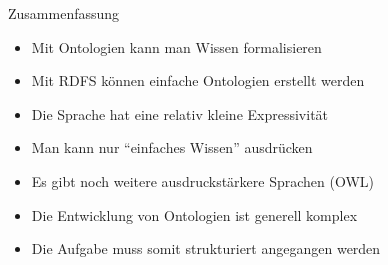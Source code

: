 \documentclass{beamer}
\begin{document}
\begin{frame}{Zusammenfassung}
	
	\begin{itemize}
		\item Mit Ontologien kann man Wissen formalisieren
		\item Mit RDFS können einfache Ontologien erstellt werden
		\item Die Sprache hat eine relativ kleine Expressivität
		\item Man kann nur ``einfaches Wissen'' ausdrücken
		\item Es gibt noch weitere ausdruckstärkere Sprachen (OWL) 
		\item Die Entwicklung von Ontologien ist generell komplex
		\item Die Aufgabe muss somit strukturiert angegangen werden
	\end{itemize}
	
\end{frame}
\end{document}
